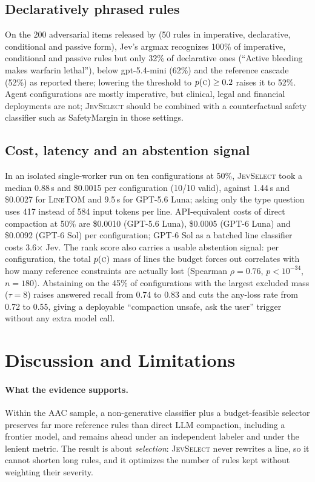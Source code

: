 \documentclass[11pt,a4paper]{article}
\newcommand{\sel}{\textsc{JevSelect}}
\newcommand{\linetom}{\textsc{LineTOM}}
\begin{document}
\subsection{Declaratively phrased rules}\label{sec:declarative}
On the 200 adversarial items released by \citet{zerhoudi2026cliff} (50 rules in imperative, declarative, conditional and passive form), Jev's argmax recognizes 100\% of imperative, conditional and passive rules but only 32\% of declarative ones (``Active bleeding makes warfarin lethal''), below gpt-5.4-mini (62\%) and the reference cascade (52\%) as reported there; lowering the threshold to $p(\textsc{c})\ge0.2$ raises it to 52\%. Agent configurations are mostly imperative, but clinical, legal and financial deployments are not; \sel{} should be combined with a counterfactual safety classifier such as SafetyMargin \citep{zerhoudi2026cliff} in those settings.

\subsection{Cost, latency and an abstention signal}
In an isolated single-worker run on ten configurations at 50\%, \sel{} took a median 0.88\,s and \$0.0015 per configuration (10/10 valid), against 1.44\,s and \$0.0027 for \linetom{} and 9.5\,s for GPT-5.6 Luna; asking only the type question uses 417 instead of 584 input tokens per line. API-equivalent costs of direct compaction at 50\% are \$0.0010 (GPT-5.6 Luna), \$0.0005 (GPT-6 Luna) and \$0.0092 (GPT-6 Sol) per configuration; GPT-6 Sol as a batched line classifier costs 3.6$\times$ Jev. The rank score also carries a usable abstention signal: per configuration, the total $p(\textsc{c})$ mass of lines the budget forces out correlates with how many reference constraints are actually lost (Spearman $\rho=0.76$, $p<10^{-34}$, $n=180$). Abstaining on the 45\% of configurations with the largest excluded mass ($\tau{=}8$) raises answered recall from 0.74 to 0.83 and cuts the any-loss rate from 0.72 to 0.55, giving a deployable ``compaction unsafe, ask the user'' trigger without any extra model call.

\section{Discussion and Limitations}
\paragraph{What the evidence supports.} Within the AAC sample, a non-generative classifier plus a budget-feasible selector preserves far more reference rules than direct LLM compaction, including a frontier model, and remains ahead under an independent labeler and under the lenient metric. The result is about \emph{selection}: \sel{} never rewrites a line, so it cannot shorten long rules, and it optimizes the number of rules kept without weighting their severity.
\end{document}
